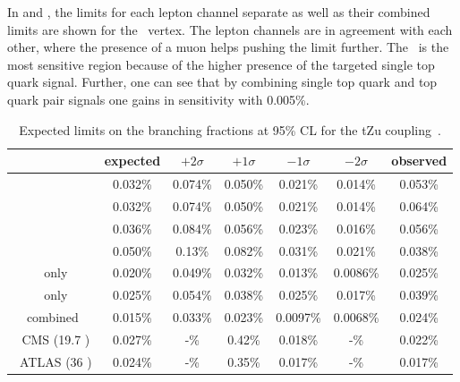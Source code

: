 In  and , the limits for each lepton channel separate as well as their combined limits are shown for the \Zut\ vertex. The lepton channels are in agreement with each other, where the presence of a muon helps pushing the limit further. The \STSR\ is the most sensitive region because of the higher presence of the targeted single top quark signal. Further, one can see that by combining single top quark and top quark pair signals  one gains in sensitivity with 0.005\%.
\begin{table}[htbp]
	\centering
	\caption{Expected limits on the branching fractions at 95\% CL for the tZu coupling~\cite{Sirunyan:2017kkr,ATLAS-CONF-2017-070}.}
	\begin{tabular}{ccccccc}
		\toprule
		& expected & $+2\sigma$ & $+1\sigma$ & $-1\sigma$ & $-2\sigma$ & observed \\ 
		\midrule
		\mumumu\ & 0.032\% & 0.074\% & 0.050\% & 0.021\% & 0.014\% & 0.053\% \\ 
	
		\emumu\ & 0.032\% & 0.074\% & 0.050\% & 0.021\% & 0.014\% & 0.064\% \\ 
		
		\eemu\ & 0.036\% & 0.084\% & 0.056\% & 0.023\% & 0.016\% & 0.056\% \\ 
		
		\eee\ & 0.050\% & 0.13\% & 0.082\% & 0.031\% & 0.021\% & 0.038\% \B \\ 
		\hdashline
		\STSR\ only & 0.020\% & 0.049\% & 0.032\% & 0.013\% & 0.0086\% & 0.025\%  \T\\ 
		
		\TTSR\ only & 0.025\% & 0.054\% & 0.038\% & 0.025\% & 0.017\% & 0.039\% \B \\ 
		\hdashline
		combined & 0.015\% & 0.033\% & 0.023\% & 0.0097\% & 0.0068\% & 0.024\%  \T \B\\ 
		\hdashline
		8 \TeV\ CMS (19.7 \fbinv)   &0.027\% & -\%  & 0.42\% & 0.018\% & -\% & 0.022\%  \T\B\\
		\hdashline
		13 \TeV\ ATLAS (36 \fbinv)   & 0.024\% & -\% &   0.35\% & 0.017\%& -\% & 0.017\% \T\\
		
		\bottomrule
	\end{tabular} 
	\label{tab:ResultsTZU}
\end{table}
